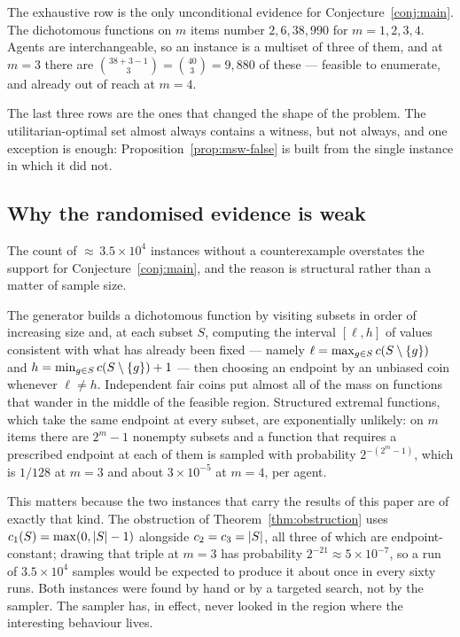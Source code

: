 The exhaustive row is the only unconditional evidence for
Conjecture~\ref{conj:main}. The dichotomous functions on $m$ items number
$2, 6, 38, 990$ for $m = 1,2,3,4$. Agents are interchangeable, so an instance is
a multiset of three of them, and at $m = 3$ there are
$\binom{38 + 3 - 1}{3} = \binom{40}{3} = 9{,}880$ of these --- feasible to
enumerate, and already out of reach at $m = 4$.

The last three rows are the ones that changed the shape of the problem. The
utilitarian-optimal set almost always contains a witness, but not always, and
one exception is enough: Proposition~\ref{prop:msw-false} is built from the
single instance in which it did not.

\subsection{Why the randomised evidence is weak}
\label{sec:samplerbias}

The count of ${\approx}\,3.5 \times 10^4$ instances without a counterexample
overstates the support for Conjecture~\ref{conj:main}, and the reason is
structural rather than a matter of sample size.

The generator builds a dichotomous function by visiting subsets in order of
increasing size and, at each subset $S$, computing the interval
$[\ell, h]$ of values consistent with what has already been fixed --- namely
$\ell = \max_{g \in S} c(S \setminus \left\{g\right\})$ and
$h = \min_{g \in S} c(S \setminus \left\{g\right\}) + 1$ --- then choosing an
endpoint by an unbiased coin whenever $\ell \ne h$. Independent fair coins put
almost all of the mass on functions that wander in the middle of the feasible
region. Structured extremal functions, which take the same endpoint at every
subset, are exponentially unlikely: on $m$ items there are $2^m - 1$ nonempty
subsets and a function that requires a prescribed endpoint at each of them is
sampled with probability $2^{-(2^m-1)}$, which is $1/128$ at $m = 3$ and about
$3 \times 10^{-5}$ at $m = 4$, per agent.

This matters because the two instances that carry the results of this paper are
of exactly that kind. The obstruction of Theorem~\ref{thm:obstruction} uses
$c_1(S) = \max(0, \left\lvert S\right\rvert-1)$ alongside $c_2 = c_3 = \left\lvert S\right\rvert$, all
three of which are endpoint-constant; drawing that triple at $m = 3$ has
probability $2^{-21} \approx 5 \times 10^{-7}$, so a run of $3.5 \times 10^4$
samples would be expected to produce it about once in every sixty runs. Both
instances were found by hand or by a targeted search, not by the sampler. The
sampler has, in effect, never looked in the region where the interesting
behaviour lives.

